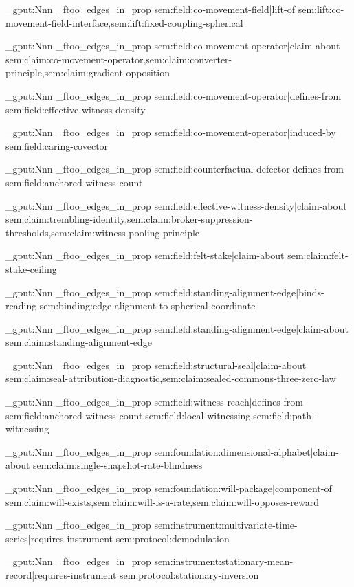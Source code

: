 \prop_gput:Nnn \g_ftoo_edges_in_prop { sem:field:co-movement-field|lift-of } { sem:lift:co-movement-field-interface,sem:lift:fixed-coupling-spherical }

\prop_gput:Nnn \g_ftoo_edges_in_prop { sem:field:co-movement-operator|claim-about } { sem:claim:co-movement-operator,sem:claim:converter-principle,sem:claim:gradient-opposition }

\prop_gput:Nnn \g_ftoo_edges_in_prop { sem:field:co-movement-operator|defines-from } { sem:field:effective-witness-density }

\prop_gput:Nnn \g_ftoo_edges_in_prop { sem:field:co-movement-operator|induced-by } { sem:field:caring-covector }

\prop_gput:Nnn \g_ftoo_edges_in_prop { sem:field:counterfactual-defector|defines-from } { sem:field:anchored-witness-count }

\prop_gput:Nnn \g_ftoo_edges_in_prop { sem:field:effective-witness-density|claim-about } { sem:claim:trembling-identity,sem:claim:broker-suppression-thresholds,sem:claim:witness-pooling-principle }

\prop_gput:Nnn \g_ftoo_edges_in_prop { sem:field:felt-stake|claim-about } { sem:claim:felt-stake-ceiling }

\prop_gput:Nnn \g_ftoo_edges_in_prop { sem:field:standing-alignment-edge|binds-reading } { sem:binding:edge-alignment-to-spherical-coordinate }

\prop_gput:Nnn \g_ftoo_edges_in_prop { sem:field:standing-alignment-edge|claim-about } { sem:claim:standing-alignment-edge }

\prop_gput:Nnn \g_ftoo_edges_in_prop { sem:field:structural-seal|claim-about } { sem:claim:seal-attribution-diagnostic,sem:claim:sealed-commons-three-zero-law }

\prop_gput:Nnn \g_ftoo_edges_in_prop { sem:field:witness-reach|defines-from } { sem:field:anchored-witness-count,sem:field:local-witnessing,sem:field:path-witnessing }

\prop_gput:Nnn \g_ftoo_edges_in_prop { sem:foundation:dimensional-alphabet|claim-about } { sem:claim:single-snapshot-rate-blindness }

\prop_gput:Nnn \g_ftoo_edges_in_prop { sem:foundation:will-package|component-of } { sem:claim:will-exists,sem:claim:will-is-a-rate,sem:claim:will-opposes-reward }

\prop_gput:Nnn \g_ftoo_edges_in_prop { sem:instrument:multivariate-time-series|requires-instrument } { sem:protocol:demodulation }

\prop_gput:Nnn \g_ftoo_edges_in_prop { sem:instrument:stationary-mean-record|requires-instrument } { sem:protocol:stationary-inversion }

